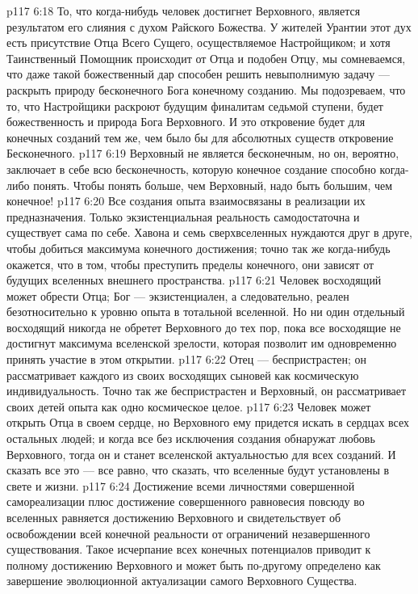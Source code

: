 \vs p117 6:18 То, что когда\hyp{}нибудь человек достигнет Верховного, является результатом его слияния с духом Райского Божества. У жителей Урантии этот дух есть присутствие Отца Всего Сущего, осуществляемое Настройщиком; и хотя Таинственный Помощник происходит от Отца и подобен Отцу, мы сомневаемся, что даже такой божественный дар способен решить невыполнимую задачу --- раскрыть природу бесконечного Бога конечному созданию. Мы подозреваем, что то, что Настройщики раскроют будущим финалитам седьмой ступени, будет божественность и природа Бога Верховного. И это откровение будет для конечных созданий тем же, чем было бы для абсолютных существ откровение Бесконечного.
\vs p117 6:19 Верховный не является бесконечным, но он, вероятно, заключает в себе всю бесконечность, которую конечное создание способно когда\hyp{}либо понять. Чтобы понять больше, чем Верховный, надо быть большим, чем конечное!
\vs p117 6:20 Все создания опыта взаимосвязаны в реализации их предназначения. Только экзистенциальная реальность самодостаточна и существует сама по себе. Хавона и семь сверхвселенных нуждаются друг в друге, чтобы добиться максимума конечного достижения; точно так же когда\hyp{}нибудь окажется, что в том, чтобы преступить пределы конечного, они зависят от будущих вселенных внешнего пространства.
\vs p117 6:21 Человек восходящий может обрести Отца; Бог --- экзистенциален, а следовательно, реален безотносительно к уровню опыта в тотальной вселенной. Но ни один отдельный восходящий никогда не обретет Верховного до тех пор, пока все восходящие не достигнут максимума вселенской зрелости, которая позволит им одновременно принять участие в этом открытии.
\vs p117 6:22 Отец --- беспристрастен; он рассматривает каждого из своих восходящих сыновей как космическую индивидуальность. Точно так же беспристрастен и Верховный, он рассматривает своих детей опыта как одно космическое целое.
\vs p117 6:23 Человек может открыть Отца в своем сердце, но Верховного ему придется искать в сердцах всех остальных людей; и когда все без исключения создания обнаружат любовь Верховного, тогда он и станет вселенской актуальностью для всех созданий. И сказать все это --- все равно, что сказать, что вселенные будут установлены в свете и жизни.
\vs p117 6:24 Достижение всеми личностями совершенной самореализации плюс достижение совершенного равновесия повсюду во вселенных равняется достижению Верховного и свидетельствует об освобождении всей конечной реальности от ограничений незавершенного существования. Такое исчерпание всех конечных потенциалов приводит к полному достижению Верховного и может быть по\hyp{}другому определено как завершение эволюционной актуализации самого Верховного Существа.
